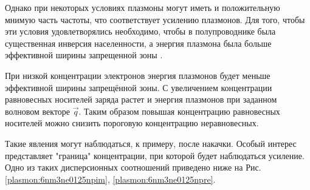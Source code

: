 \documentclass[../main.tex]{subfiles}
\begin{document}
    Однако при некоторых условиях плазмоны могут иметь и положительную мнимую часть частоты, что соответствует усилению плазмонов. Для того, 
    чтобы эти условия удовлетворялись необходимо, чтобы в полупроводнике была существенная инверсия населенности, а энергия плазмона была больше 
    эффективной ширины запрещенной зоны \cite{kapralov2019feasibility}. 

    При низкой концентрации электронов энергия плазмонов будет меньше эффективной ширины запрещённой зоны. С увеличением концентрации
    равновесных носителей заряда растет и энергия плазмонов при заданном волновом векторе $\vec q$. Таким образом повышая концентрацию
    равновесных носителей можно снизить пороговую концентрацию неравновесных. 

    
    Такие явления могут наблюдаться, к примеру, после накачки. 
    Особый интерес представляет "граница" концентрации, при которой будет наблюдаться усиление. Одно из таких дисперсионных соотношений 
    приведено ниже на Рис. \ref{plasmon:6nm3ne0125npim}, \ref{plasmon:6nm3ne0125npre}.
\end{document}
